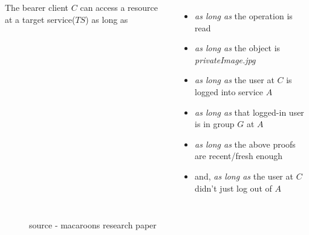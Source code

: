 \documentclass[9pt]{beamer}
\begin{document}
\begin{frame}
  \begin{columns}
    The bearer client $C$ can access a resource at a target service($TS$) as long as
    \begin{itemize}
      \item \textit{as long as} the operation is read
      \item \textit{as long as} the object is \textit{privateImage.jpg}
      \item \textit{as long as} the user at $C$ is logged into service $A$
      \item \textit{as long as} that logged-in user is in group $G$ at $A$
      \item \textit{as long as} the above proofs are recent/fresh enough
      \item and, \textit{as long as} the user at $C$ didn’t just log out of $A$
    \end{itemize}
    \pause
  \end{columns}
\end{frame}

\begin{frame}
  \begin{figure}
    \caption{source - macaroons research paper}
  \end{figure}
  
\end{frame}
\end{document}
